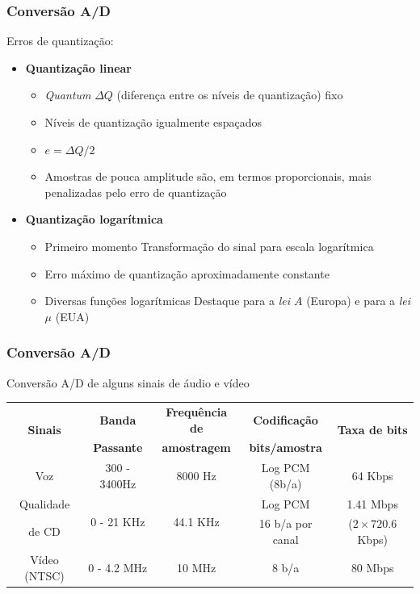 \documentclass[xcolor]{beamer}
\begin{document}
\begin{frame}
    \frametitle{Conversão A/D}

    Erros de quantização:

    \begin{itemize}
        \item {\bf Quantização linear}
        \begin{itemize}
            \item {\it Quantum} $\Delta Q$ (diferença entre os níveis de
                  quantização) fixo
            \item Níveis de quantização igualmente espaçados
            \item $e = \Delta Q / 2$
            \item Amostras de pouca amplitude são, em termos proporcionais, mais
                  penalizadas pelo erro de quantização
        \end{itemize}

        \item {\bf Quantização logarítmica}
        \begin{itemize}
            \item Primeiro momento \implica Transformação do sinal para escala
                  logarítmica
            \item Erro máximo de quantização aproximadamente constante
            \item Diversas funções logarítmicas \implica Destaque para a {\it
                  lei $A$} (Europa) e para a {\it lei $\mu$} (EUA)
        \end{itemize}
    \end{itemize}
\end{frame}

\begin{frame}
    \frametitle{Conversão A/D}

    Conversão A/D de alguns sinais de áudio e vídeo

    \begin{table}
    \scriptsize
    \begin{tabular}{|c|c|c|c|c|}
    \hline
    \multirow{2}{*}{\bf Sinais} & {\bf Banda} & {\bf Frequência de} & {\bf
    Codificação} & \multirow{2}{*}{\bf Taxa de bits}\\
    & {\bf Passante} & {\bf amostragem} & {\bf bits/amostra} & \\
    \hline
    \hline
    Voz & 300 - 3400Hz & 8000 Hz & Log PCM (8b/a) & 64 Kbps\\
    \hline
    Qualidade & \multirow{2}{*}{0 - 21 KHz} & \multirow{2}{*}{44.1 KHz} & Log
    PCM & 1.41 Mbps\\
    de CD & & & 16 b/a por canal & ($2 \times 720.6$ Kbps)\\
    \hline
    Vídeo (NTSC) & 0 - 4.2 MHz & 10 MHz & 8 b/a & 80 Mbps\\
    \hline
    \end{tabular}
    \end{table}
\end{frame}
\end{document}
